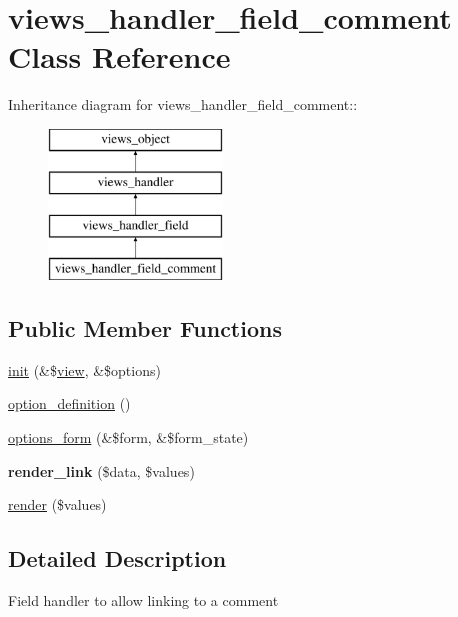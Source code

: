 \hypertarget{classviews__handler__field__comment}{
\section{views\_\-handler\_\-field\_\-comment Class Reference}
\label{classviews__handler__field__comment}
}
Inheritance diagram for views\_\-handler\_\-field\_\-comment::\begin{figure}[H]
\begin{center}
\leavevmode
\includegraphics[height=4cm]{classviews__handler__field__comment}
\end{center}
\end{figure}
\subsection*{Public Member Functions}
\begin{CompactItemize}
\item 
\hyperlink{classviews__handler__field__comment_284d26dff5d2ddba3a2f692bf375d770}{init} (\&\$\hyperlink{classview}{view}, \&\$options)
\item 
\hyperlink{classviews__handler__field__comment_73136303aae33442ce2ea156c1262b22}{option\_\-definition} ()
\item 
\hyperlink{classviews__handler__field__comment_5afe1cb8daaae349f0f39b9ce0195753}{options\_\-form} (\&\$form, \&\$form\_\-state)
\item 
\hypertarget{classviews__handler__field__comment_d8addc0047740d49844d5c0aa3f05e75}{
\textbf{render\_\-link} (\$data, \$values)}
\label{classviews__handler__field__comment_d8addc0047740d49844d5c0aa3f05e75}

\item 
\hyperlink{classviews__handler__field__comment_c5e0fecfcd448920e3d837c1daed59fa}{render} (\$values)
\end{CompactItemize}


\subsection{Detailed Description}
Field handler to allow linking to a comment 

